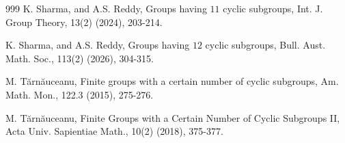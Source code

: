 \documentclass[a4paper,11pt]{amsart}
\numberwithin{equation}{section}
\numberwithin{equation}{subsection}
\begin{document}
\begin{thebibliography}{999}
K. Sharma, and A.S. Reddy, Groups having $11 $ cyclic subgroups, Int. J. Group Theory, 13(2) (2024), 203-214.

K. Sharma, and A.S. Reddy, Groups having $12 $ cyclic subgroups, Bull. Aust. Math. Soc., 113(2) (2026), 304-315.

M. Tărnăuceanu, Finite groups with a certain number of cyclic subgroups, Am. Math. Mon., 122.3 (2015), 275-276.

M. Tărnăuceanu, Finite Groups with a Certain Number of Cyclic Subgroups II, Acta Univ. Sapientiae Math., 10(2) (2018), 375-377.

\end{thebibliography}
\end{document}
